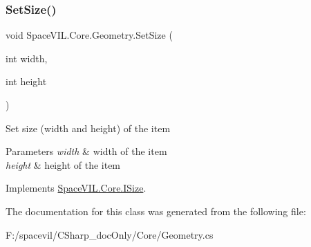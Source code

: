 \subsubsection{\texorpdfstring{Set\+Size()}{SetSize()}}
{\footnotesize\ttfamily void Space\+V\+I\+L.\+Core.\+Geometry.\+Set\+Size (\begin{DoxyParamCaption}\item[{int}]{width,  }\item[{int}]{height }\end{DoxyParamCaption})}



Set size (width and height) of the item 


\begin{DoxyParams}{Parameters}
{\em width} & width of the item \\
\hline
{\em height} & height of the item \\
\hline
\end{DoxyParams}


Implements \mbox{\hyperlink{interface_space_v_i_l_1_1_core_1_1_i_size}{Space\+V\+I\+L.\+Core.\+I\+Size}}.



The documentation for this class was generated from the following file\+:\begin{DoxyCompactItemize}
\item 
F\+:/spacevil/\+C\+Sharp\+\_\+doc\+Only/\+Core/Geometry.\+cs\end{DoxyCompactItemize}

